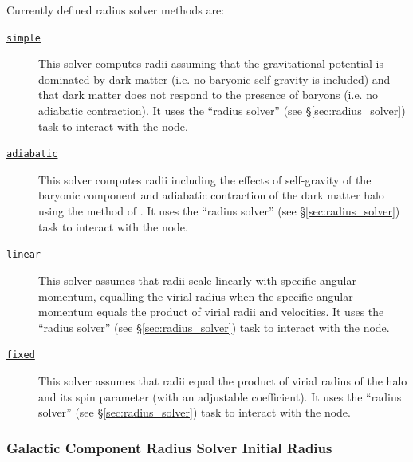 Currently defined radius solver methods are:
\begin{description}
 \item [\hyperlink{galactic_structure.radius_solver.simple.F90:galactic_structure_radii_simple:galactic_structure_radii_solve_simple}{{\tt simple}}] This solver computes radii assuming that the gravitational potential is dominated by dark matter (i.e. no baryonic self-gravity is included) and that dark matter does not respond to the presence of baryons (i.e. no adiabatic contraction). It uses the ``radius solver'' (see \S\ref{sec:radius_solver}) task to interact with the node.
 \item [\hyperlink{galactic_structure.radius_solver.adiabatic.F90:galactic_structure_radii_adiabatic:galactic_structure_radii_solve_adiabatic}{{\tt adiabatic}}] This solver computes radii including the effects of self-gravity of the baryonic component and adiabatic contraction of the dark matter halo using the method of \cite{gnedin_response_2004}. It uses the ``radius solver'' (see \S\ref{sec:radius_solver}) task to interact with the node.
 \item [\hyperlink{galactic_structure.radius_solver.linear.F90:galactic_structure_radii_linear:galactic_structure_radii_solve_linear}{{\tt linear}}] This solver assumes that radii scale linearly with specific angular momentum, equalling the virial radius when the specific angular momentum equals the product of virial radii and velocities. It uses the ``radius solver'' (see \S\ref{sec:radius_solver}) task to interact with the node.
 \item [\hyperlink{galactic_structure.radius_solver.fixed.F90:galactic_structure_radii_fixed:galactic_structure_radii_solve_fixed}{{\tt fixed}}] This solver assumes that radii equal the product of virial radius of the halo and its spin parameter (with an adjustable coefficient). It uses the ``radius solver'' (see \S\ref{sec:radius_solver}) task to interact with the node.
\end{description}

\subsubsection{Galactic Component Radius Solver Initial Radius}

